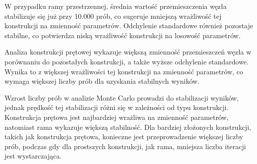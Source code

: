 W przypadku ramy przestrzennej, średnia wartość przemieszczenia węzła stabilizuje się już przy 10.000 prób, co sugeruje mniejszą wrażliwość tej konstrukcji na zmienność parametrów.
Odchylenie standardowe również pozostaje stabilne, co potwierdza niską wrażliwość konstrukcji na losowość parametrów.

Analiza konstrukcji prętowej wykazuje większą zmienność przemieszczeń węzła w porównaniu do pozostałych konstrukcji, a także wyższe odchylenie standardowe.
Wynika to z większej wrażliwości tej konstrukcji na zmienność parametrów, co wymaga większej liczby prób dla uzyskania stabilnych wyników.

Wzrost liczby prób w analizie Monte Carlo prowadzi do stabilizacji wyników, jednak prędkość tej stabilizacji różni się w zależności od typu konstrukcji.
Konstrukcja prętowa jest najbardziej wrażliwa na zmienność parametrów, natomiast rama wykazuje większą stabilność.
Dla bardziej złożonych konstrukcji, takich jak konstrukcja prętowa, konieczne jest przeprowadzenie większej liczby prób, podczas gdy dla prostszych konstrukcji, jak rama, mniejsza liczba iteracji jest wystarczająca.
